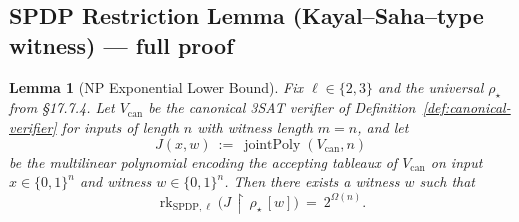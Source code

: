 \documentclass[12pt]{article}
\newtheorem{lemma}[theorem]{Lemma}
\theoremstyle{definition}
\theoremstyle{definition}
\theoremstyle{remark}
\theoremstyle{remark}
\begin{document}
\subsection{SPDP Restriction Lemma (Kayal--Saha--type witness) --- full proof}

\begin{lemma}[NP Exponential Lower Bound]\label{lem:np-spdp-lb}\label{lem:np-lb-relaxed}
Fix $\ell\in\{2,3\}$ and the universal $\rho_\star$ from \S17.7.4. Let $V_{\mathrm{can}}$ be the canonical 3SAT verifier of Definition~\ref{def:canonical-verifier} for inputs of length $n$ with witness length $m=n$, and let
\[
J(x,w)\ :=\ \operatorname{jointPoly}(V_{\mathrm{can}},n)
\]
be the multilinear polynomial encoding the accepting tableaux of $V_{\mathrm{can}}$ on input $x\in\{0,1\}^n$ and witness $w\in\{0,1\}^n$. Then there exists a witness $w$ such that
\[
\operatorname{rk}_{\mathrm{SPDP},\ell}\!\big(J\,\upharpoonright\,\rho_\star\,[w]\big)\ =\ 2^{\Omega(n)}.
\]
\end{lemma}
\end{document}
